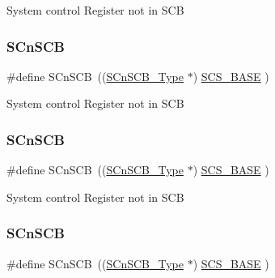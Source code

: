 System control Register not in S\+CB \mbox{\label{group___c_m_s_i_s__core__base_ga9fe0cd2eef83a8adad94490d9ecca63f}} 
\subsubsection{\texorpdfstring{SCnSCB}{SCnSCB}\hspace{0.1cm}{\footnotesize\ttfamily [4/8]}}
{\footnotesize\ttfamily \#define S\+Cn\+S\+CB~((\mbox{\hyperlink{struct_s_cn_s_c_b___type}{S\+Cn\+S\+C\+B\+\_\+\+Type}}    $\ast$)     \mbox{\hyperlink{group___c_m_s_i_s__core__base_ga3c14ed93192c8d9143322bbf77ebf770}{S\+C\+S\+\_\+\+B\+A\+SE}}      )}

System control Register not in S\+CB \mbox{\label{group___c_m_s_i_s__core__base_ga9fe0cd2eef83a8adad94490d9ecca63f}} 
\subsubsection{\texorpdfstring{SCnSCB}{SCnSCB}\hspace{0.1cm}{\footnotesize\ttfamily [5/8]}}
{\footnotesize\ttfamily \#define S\+Cn\+S\+CB~((\mbox{\hyperlink{struct_s_cn_s_c_b___type}{S\+Cn\+S\+C\+B\+\_\+\+Type}}    $\ast$)     \mbox{\hyperlink{group___c_m_s_i_s__core__base_ga3c14ed93192c8d9143322bbf77ebf770}{S\+C\+S\+\_\+\+B\+A\+SE}}      )}

System control Register not in S\+CB \mbox{\label{group___c_m_s_i_s__core__base_ga9fe0cd2eef83a8adad94490d9ecca63f}} 
\subsubsection{\texorpdfstring{SCnSCB}{SCnSCB}\hspace{0.1cm}{\footnotesize\ttfamily [6/8]}}
{\footnotesize\ttfamily \#define S\+Cn\+S\+CB~((\mbox{\hyperlink{struct_s_cn_s_c_b___type}{S\+Cn\+S\+C\+B\+\_\+\+Type}}    $\ast$)     \mbox{\hyperlink{group___c_m_s_i_s__core__base_ga3c14ed93192c8d9143322bbf77ebf770}{S\+C\+S\+\_\+\+B\+A\+SE}}      )}

